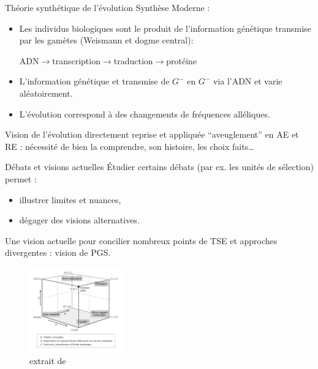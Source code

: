 \documentclass[8pt, handout=show,notes=show]{beamer}
\begin{document}
\begin{frame}{Théorie synthétique de l'évolution}
	Synthèse Moderne :
	\vfill
	\begin{itemize}
		\item	Les individus biologiques sont le produit de l'information génétique transmise par les gamètes (Weismann et dogme central):
			\begin{center}
				ADN$\rightarrow$transcription$\rightarrow$traduction$\rightarrow$protéine
			\end{center}
		\item L'information génétique et transmise de $G^-$ en $G^-$ via l'ADN et varie aléatoirement.
		\item L'évolution correspond à des changements de fréquences alléliques.
	\end{itemize}
	\vfill
	Vision de l'évolution directement reprise et appliquée ``aveuglement'' en AE et RE : nécessité de bien la comprendre, son histoire, les choix faits\dots
\end{frame}
\begin{frame}{Débats et visions actuelles}
	\'Etudier certains débats (par ex. les unités de sélection) permet :

	\begin{itemize}
		\item illustrer limites et nuances,
		\item dégager des visions alternatives.
	\end{itemize}

	\vfill
	Une vision actuelle pour concilier nombreux points de TSE et approches divergentes : vision de PGS.
	\begin{figure}[h]
		\begin{center}
			\includegraphics[width=4cm]{./images/PGS.png}
			\caption{extrait de \citet[p.~64]{godfrey2009darwinian}}
		\end{center}
	\end{figure}
\end{frame}

\end{document}
